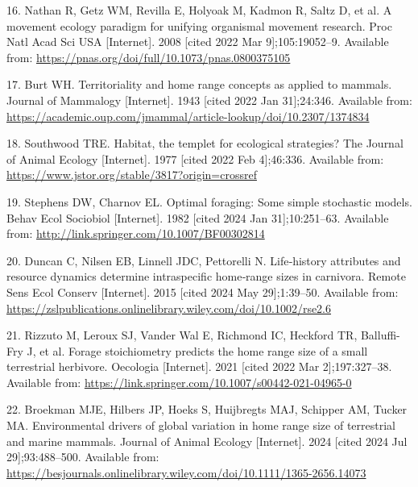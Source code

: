 \documentclass[
  12pt,
]{article}
\newlength{\cslhangindent}
\newenvironment{CSLReferences}[2] %
 {\begin{list}{}{%
  \setlength{\itemindent}{0pt}
  \setlength{\leftmargin}{0pt}
  \setlength{\parsep}{0pt}
  \ifodd #1
   \setlength{\leftmargin}{\cslhangindent}
   \setlength{\itemindent}{-1\cslhangindent}
  \fi
  \setlength{\itemsep}{#2\baselineskip}}}
 {\end{list}}
\begin{document}
\begin{CSLReferences}{0}{1}
16. Nathan R, Getz WM, Revilla E, Holyoak M, Kadmon R, Saltz D, et al. A movement ecology paradigm for unifying organismal movement research. Proc Natl Acad Sci USA {[}Internet{]}. 2008 {[}cited 2022 Mar 9{]};105:19052--9. Available from: \url{https://pnas.org/doi/full/10.1073/pnas.0800375105}

17. Burt WH. Territoriality and home range concepts as applied to mammals. Journal of Mammalogy {[}Internet{]}. 1943 {[}cited 2022 Jan 31{]};24:346. Available from: \url{https://academic.oup.com/jmammal/article-lookup/doi/10.2307/1374834}

18. Southwood TRE. Habitat, the templet for ecological strategies? The Journal of Animal Ecology {[}Internet{]}. 1977 {[}cited 2022 Feb 4{]};46:336. Available from: \url{https://www.jstor.org/stable/3817?origin=crossref}

19. Stephens DW, Charnov EL. Optimal foraging: Some simple stochastic models. Behav Ecol Sociobiol {[}Internet{]}. 1982 {[}cited 2024 Jan 31{]};10:251--63. Available from: \url{http://link.springer.com/10.1007/BF00302814}

20. Duncan C, Nilsen EB, Linnell JDC, Pettorelli N. Life‐history attributes and resource dynamics determine intraspecific home‐range sizes in carnivora. Remote Sens Ecol Conserv {[}Internet{]}. 2015 {[}cited 2024 May 29{]};1:39--50. Available from: \url{https://zslpublications.onlinelibrary.wiley.com/doi/10.1002/rse2.6}

21. Rizzuto M, Leroux SJ, Vander Wal E, Richmond IC, Heckford TR, Balluffi-Fry J, et al. Forage stoichiometry predicts the home range size of a small terrestrial herbivore. Oecologia {[}Internet{]}. 2021 {[}cited 2022 Mar 2{]};197:327--38. Available from: \url{https://link.springer.com/10.1007/s00442-021-04965-0}

22. Broekman MJE, Hilbers JP, Hoeks S, Huijbregts MAJ, Schipper AM, Tucker MA. Environmental drivers of global variation in home range size of terrestrial and marine mammals. Journal of Animal Ecology {[}Internet{]}. 2024 {[}cited 2024 Jul 29{]};93:488--500. Available from: \url{https://besjournals.onlinelibrary.wiley.com/doi/10.1111/1365-2656.14073}


\end{CSLReferences}
\end{document}
